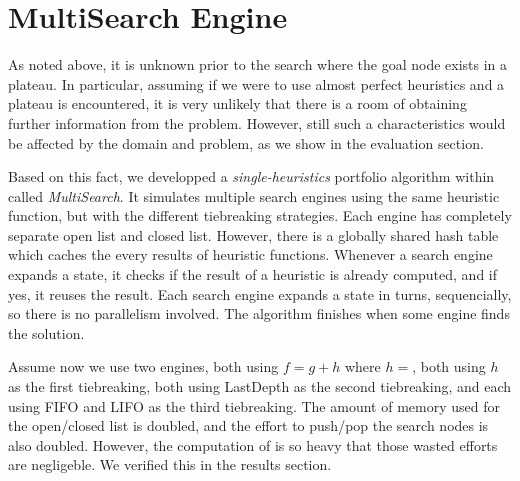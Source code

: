  
\section{MultiSearch Engine}

As noted above, it is unknown prior to the search where the goal node
exists in a plateau. In particular, assuming if we were to use almost
perfect heuristics and a plateau is encountered, it is very unlikely
that there is a room of obtaining further information from the problem.
However, still such a characteristics would be affected by the domain
and problem, as we show in the evaluation section.

Based on this fact, we developped a \emph{single-heuristics} portfolio
algorithm within \astar called \emph{MultiSearch}.  It simulates
multiple search engines using the same heuristic function, but with the
different tiebreaking strategies.  Each engine has completely separate
open list and closed list.  However, there is a globally shared hash
table which caches the every results of heuristic functions.  Whenever a
search engine expands a state, it checks if the result of a heuristic is
already computed, and if yes, it reuses the result.  Each search engine
expands a state in turns, sequencially, so there is no parallelism
involved. The algorithm finishes when some engine finds the solution.

Assume now we use two \astar engines, both using $f=g+h$ where
$h=$\lmcut, both using $h$ as the first tiebreaking, both using
LastDepth as the second tiebreaking, and each using FIFO and LIFO as the third tiebreaking.
The amount of memory used for the open/closed list is doubled, and the effort to push/pop the search nodes is also doubled.
However, the computation of \lmcut is so heavy that those wasted efforts are negligeble.
We verified this in the results section.

% 

